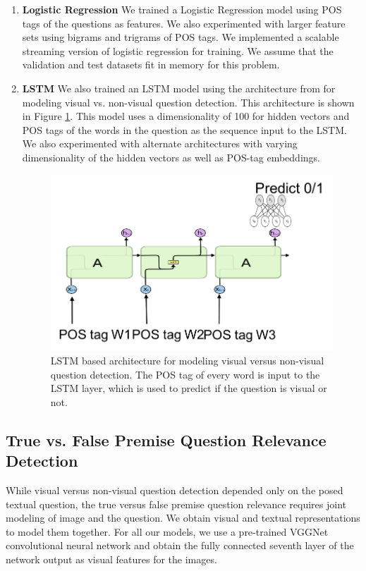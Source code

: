 \begin{enumerate}
\item \textbf{Logistic Regression} We trained a Logistic Regression model using POS tags of the questions as features. We also experimented with larger feature sets using bigrams and trigrams of POS tags. We implemented a scalable streaming version of logistic regression for training. We assume that the validation and test datasets fit in memory for this problem. 

\item \textbf{LSTM} We also trained an LSTM model using the architecture from \cite{ray2016question} for modeling visual vs. non-visual question detection. This architecture is shown in Figure \ref{fig:LSTM0}. This model uses a dimensionality of 100 for hidden vectors and POS tags of the words in the question as the sequence input to the LSTM. We also experimented with alternate architectures with varying dimensionality of the hidden vectors as well as POS-tag embeddings.
\begin{figure}[t]
\begin{center}
  \includegraphics[width=0.8\linewidth]{images/lstm_p1}
\end{center}
   \caption{LSTM based architecture for modeling visual versus non-visual question detection. The POS tag of every word is input to the LSTM layer, which is used to predict if the question is visual or not.}
\label{fig:LSTM0}
\end{figure}
\end{enumerate}

\subsection{True vs. False Premise Question Relevance Detection}

While visual versus non-visual question detection depended only on the posed textual question, the true versus false premise question relevance requires joint modeling of image and the question. We obtain visual and textual representations to model them together. For all our models, we use a pre-trained VGGNet \cite{simonyan2014very} convolutional neural network and obtain the fully connected seventh layer of the network output as visual features for the images.

